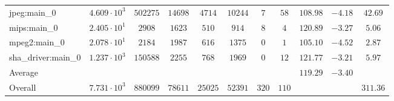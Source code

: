 \begin{tabular}{|l|c|c|c|c|c|c|c|c|c|c|}
jpeg:main\_0            & $ 4.609 \cdot 10^{3} $ & $ 502275 $ & $ 14698 $ & $ 4714  $ & $ 10244 $ & $ 7   $ & $ 58  $ & $ 108.98      $ & $ -4.18   $ & $ 42.69   $ \\
mips:main\_0            & $ 2.405 \cdot 10^{1} $ & $ 2908   $ & $ 1623  $ & $ 510   $ & $ 914   $ & $ 8   $ & $ 4   $ & $ 120.89      $ & $ -3.27   $ & $ 5.06    $ \\
mpeg2:main\_0           & $ 2.078 \cdot 10^{1} $ & $ 2184   $ & $ 1987  $ & $ 616   $ & $ 1375  $ & $ 0   $ & $ 1   $ & $ 105.10      $ & $ -4.52   $ & $ 2.87    $ \\
sha\_driver:main\_0     & $ 1.237 \cdot 10^{3} $ & $ 150588 $ & $ 2255  $ & $ 768   $ & $ 1969  $ & $ 0   $ & $ 12  $ & $ 121.77      $ & $ -3.21   $ & $ 5.97    $ \\
\hline
Average                 & $                    $ & $        $ & $       $ & $       $ & $       $ & $     $ & $     $ & $ 119.29      $ & $ -3.40   $ & $         $ \\
\hline
Overall                 & $ 7.731 \cdot 10^{3} $ & $ 880099 $ & $ 78611 $ & $ 25025 $ & $ 52391 $ & $ 320 $ & $ 110 $ & $             $ & $         $ & $ 311.36  $ \\
\hline
\end{tabular}

